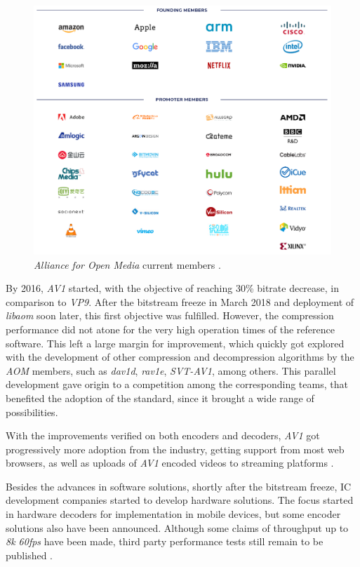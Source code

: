 \begin{figure}[!htbp]
    \centering
    \includegraphics[width=\textwidth]{Sections/2AV1/Diagrams/Images/AOM.png}
    \caption[\emph{Alliance for Open Media} current members]{\emph{Alliance for Open Media} current members \cite{aomediaHome}.} 
    \label{fig:aom}
\end{figure}

By 2016, \emph{AV1} started, with the objective of reaching 30\% bitrate decrease, in comparison to \emph{VP9}. After the bitstream freeze in March 2018 and deployment of \emph{libaom} soon later, this first objective was fulfilled. However, the compression performance did not atone for the very high operation times of the reference software. This left a large margin for improvement, which quickly got explored with the development of other compression and decompression algorithms by the \emph{AOM} members, such as \emph{dav1d}, \emph{rav1e}, \emph{SVT-AV1},  among others. This parallel development gave origin to a competition among the corresponding teams, that benefited the adoption of the standard, since it brought a wide range of possibilities. 

With the improvements verified on both encoders and decoders, \emph{AV1} got progressively more adoption from the industry, getting support from most web browsers, as well as uploads of \emph{AV1} encoded videos to streaming platforms \cite{eggeLatestTechnicalBusiness2019}.

Besides the advances in software solutions, shortly after the bitstream freeze, IC development companies started to develop hardware solutions. The focus started in hardware decoders for implementation in mobile devices, but some encoder solutions also have been announced. Although some claims of throughput up to \emph{8k 60fps} have been made, third party performance tests still remain to be published \cite{AllegroDVTIntroduces2019,NGCodecAnnouncesAV1, shilovRealtekDemonstratesRTD2893, RealtekLaunchesWorldwide, SocionextImplementsAV12018}.

